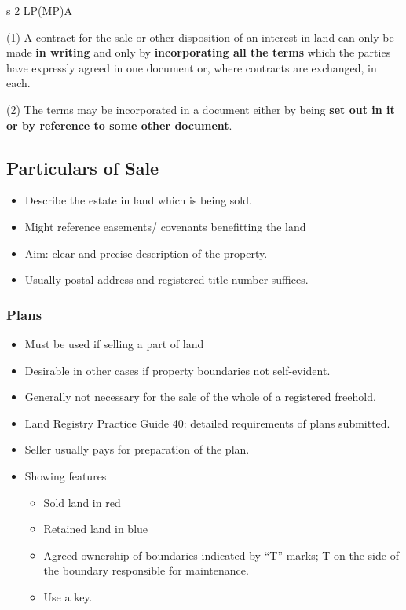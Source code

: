 \documentclass[
]{article}
\providecommand{\tightlist}{%
  \setlength{\itemsep}{0pt}\setlength{\parskip}{0pt}}
\newenvironment{env-b1feafbb-b990-4f84-956e-67a6473913ab}
{
    \savenotes\tcolorbox[blanker,breakable,left=5pt,borderline west={2pt}{-4pt}{green}]
}
{
    \endtcolorbox\spewnotes
}
\begin{document}
\begin{env-b1feafbb-b990-4f84-956e-67a6473913ab}

s 2 LP(MP)A

(1) A contract for the sale or other disposition of an interest in land
can only be made \textbf{in writing} and only by \textbf{incorporating
all the terms} which the parties have expressly agreed in one document
or, where contracts are exchanged, in each.

(2) The terms may be incorporated in a document either by being
\textbf{set out in it or by reference to some other document}.

\end{env-b1feafbb-b990-4f84-956e-67a6473913ab}

\hypertarget{particulars-of-sale}{%
\subsection{Particulars of Sale}\label{particulars-of-sale}}

\begin{itemize}
\tightlist
\item
  Describe the estate in land which is being sold.
\item
  Might reference easements/ covenants benefitting the land
\item
  Aim: clear and precise description of the property.
\item
  Usually postal address and registered title number suffices.
\end{itemize}

\hypertarget{plans}{%
\subsubsection{Plans}\label{plans}}

\begin{itemize}
\tightlist
\item
  Must be used if selling a part of land
\item
  Desirable in other cases if property boundaries not self-evident.
\item
  Generally not necessary for the sale of the whole of a registered
  freehold.
\item
  Land Registry Practice Guide 40: detailed requirements of plans
  submitted.
\item
  Seller usually pays for preparation of the plan.
\item
  Showing features

  \begin{itemize}
  \tightlist
  \item
    Sold land in red
  \item
    Retained land in blue
  \item
    Agreed ownership of boundaries indicated by ``T'' marks; T on the
    side of the boundary responsible for maintenance.
  \item
    Use a key.
  \end{itemize}
\end{itemize}
\end{document}
